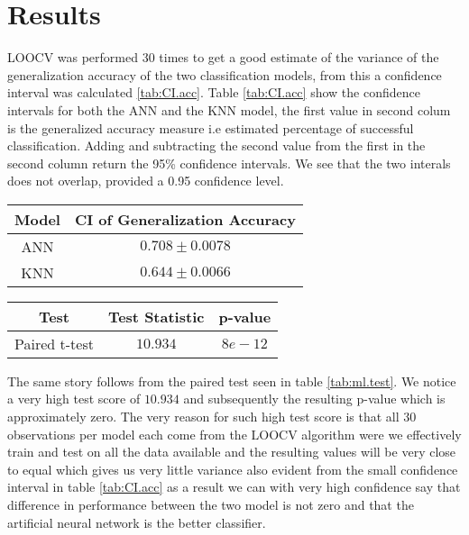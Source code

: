 \documentclass{article}
\begin{document}
\section{Results}
LOOCV was performed 30 times to get a good estimate of the variance of the generalization accuracy of the two classification models, from this a confidence interval was calculated \ref{tab:CI.acc}. Table \ref{tab:CI.acc} show the confidence intervals for both the ANN and the KNN model, the first value in second colum is the generalized accuracy measure i.e estimated percentage of successful classification. Adding and subtracting the second value from the first in the second column return the 95\% confidence intervals. We see that the two interals does not overlap, provided a 0.95 confidence level.

\begin{minipage}{\linewidth}
\centering
{} 
\begin{tabular}{ c c}\toprule[1.0pt]
\bf Model  & \bf CI of Generalization Accuracy \\\midrule[1.5pt]
ANN  & $0.708 \pm 0.0078$  \\\midrule
KNN  & $0.644 \pm 0.0066$ \\
\bottomrule[1.25pt]
\end {tabular}\par
\label{tab:CI.acc}
\end{minipage} \bigskip

\begin{minipage}{\linewidth}
	\centering
	\begin{tabular}{ c c c}\toprule[1.0pt]
	\bf Test  & \bf Test Statistic & \bf p-value \\\midrule[1.5pt] 
	Paired t-test  & $10.934$ &  $8e-12$ \\
	\bottomrule[1.1pt]
	\end {tabular}\par
	\label{tab:ml.test}
\end{minipage} \bigskip

The same story follows from the paired test seen in table \ref{tab:ml.test}. We notice a very high test score of $10.934$ and subsequently the resulting p-value which is approximately zero. The very reason for such high test score is that all 30 observations per model each come from the LOOCV algorithm were we effectively train and test on all the data available and the resulting values will be very close to equal which gives us very little variance also evident from the small confidence interval in table \ref{tab:CI.acc} as a result we can with very high confidence say that difference in performance between the two model is not zero and that the artificial neural network is the better classifier.
\end{document}

